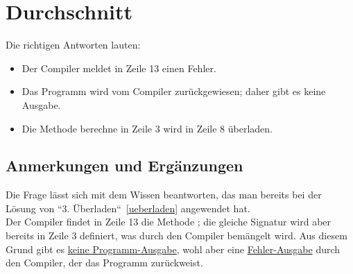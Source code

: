 \chapter{Durchschnitt}

Die richtigen Antworten lauten:

\begin{itemize}
    \item Der Compiler meldet in Zeile 13 einen Fehler.
    \item Das Programm wird vom Compiler zurückgewiesen; daher gibt es keine Ausgabe.
    \item Die Methode berechne in Zeile 3 wird in Zeile 8 überladen.
\end{itemize}


\section*{Anmerkungen und Ergänzungen}

Die Frage lässt sich mit dem Wissen beantworten, das man bereits bei der Lösung von ``3. Überladen``~\ref{ueberladen} angewendet hat.\\

Der Compiler findet in Zeile 13 die Methode ; die gleiche Signatur wird aber bereits in Zeile 3
definiert, was durch den Compiler bemängelt wird.
Aus diesem Grund gibt es \underline{keine Programm-Ausgabe}, wohl aber
eine \underline{Fehler-Ausgabe} durch den Compiler, der das Programm zurückweist.
